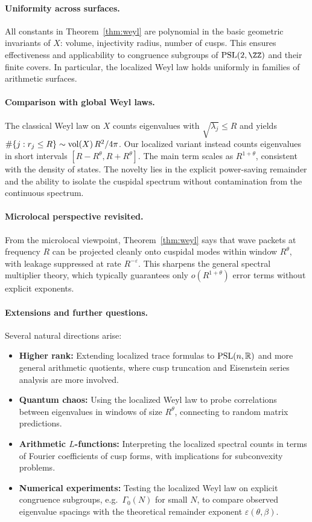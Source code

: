 \paragraph{Uniformity across surfaces.}
All constants in Theorem~\ref{thm:weyl} are polynomial in the basic geometric invariants of $X$: volume, injectivity radius, number of cusps. This ensures effectiveness and applicability to congruence subgroups of $\PSL(2,\ZZ)$ and their finite covers. In particular, the localized Weyl law holds uniformly in families of arithmetic surfaces.

\paragraph{Comparison with global Weyl laws.}
The classical Weyl law on $X$ counts eigenvalues with $\sqrt{\lambda_j}\le R$ and yields $\#\{j: r_j\le R\} \sim \operatorname{vol}(X)\,R^2/4\pi$. Our localized variant instead counts eigenvalues in short intervals $[R-R^\theta,R+R^\theta]$. The main term scales as $R^{1+\theta}$, consistent with the density of states. The novelty lies in the explicit power-saving remainder and the ability to isolate the cuspidal spectrum without contamination from the continuous spectrum.

\paragraph{Microlocal perspective revisited.}
From the microlocal viewpoint, Theorem~\ref{thm:weyl} says that wave packets at frequency $R$ can be projected cleanly onto cuspidal modes within window $R^\theta$, with leakage suppressed at rate $R^{-\varepsilon}$. This sharpens the general spectral multiplier theory, which typically guarantees only $o(R^{1+\theta})$ error terms without explicit exponents.

\paragraph{Extensions and further questions.}
Several natural directions arise:
\begin{itemize}
\item \textbf{Higher rank:} Extending localized trace formulas to $\mathrm{PSL}(n,\mathbb{R})$ and more general arithmetic quotients, where cusp truncation and Eisenstein series analysis are more involved.
\item \textbf{Quantum chaos:} Using the localized Weyl law to probe correlations between eigenvalues in windows of size $R^\theta$, connecting to random matrix predictions.
\item \textbf{Arithmetic $L$-functions:} Interpreting the localized spectral counts in terms of Fourier coefficients of cusp forms, with implications for subconvexity problems.
\item \textbf{Numerical experiments:} Testing the localized Weyl law on explicit congruence subgroups, e.g.\ $\Gamma_0(N)$ for small $N$, to compare observed eigenvalue spacings with the theoretical remainder exponent $\varepsilon(\theta,\beta)$.
\end{itemize}

